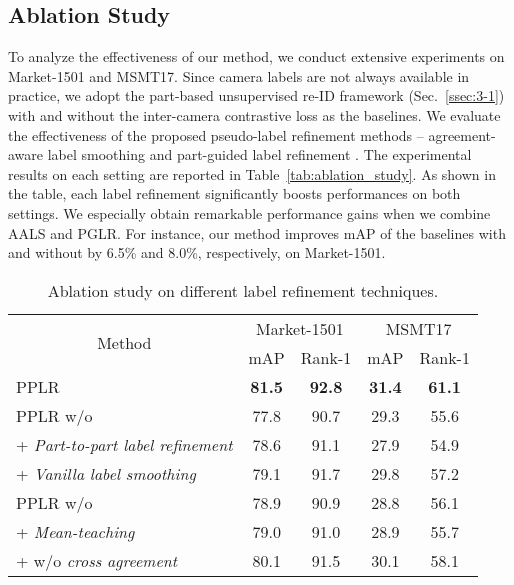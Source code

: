 \documentclass[10pt,twocolumn,letterpaper]{article}
\begin{document}
\subsection{Ablation Study}
    To analyze the effectiveness of our method, we conduct extensive experiments on Market-1501 and MSMT17.
    Since camera labels are not always available in practice, we adopt the part-based unsupervised re-ID framework (Sec.~\ref{ssec:3-1}) with and without the inter-camera contrastive loss  as the baselines.
    We evaluate the effectiveness of the proposed pseudo-label refinement methods -- agreement-aware label smoothing  and part-guided label refinement . 
    The experimental results on each setting are reported in Table~\ref{tab:ablation_study}.
    As shown in the table, each label refinement significantly boosts performances on both settings.
    We especially obtain remarkable performance gains when we combine AALS and PGLR. For instance, our method improves mAP of the baselines with and without  by 6.5\% and 8.0\%, respectively, on Market-1501.
    
    \begin{table}[t]
    	\centering	
    	\begin{adjustbox}{max width=\columnwidth}
    	\footnotesize
        \begin{tabular}{l|cc|cc}
        \hline
        \multicolumn{1}{c|}{\multirow{2}{*}{Method}} & \multicolumn{2}{c|}{Market-1501} & \multicolumn{2}{c}{MSMT17} \\ \cline{2-5} 
         & mAP & Rank-1 & mAP & Rank-1 \\ \hline
        PPLR & \textbf{81.5} & \textbf{92.8} & \textbf{31.4} & \textbf{61.1}\\ \hline
        PPLR w/o  & 77.8 & 90.7 & 29.3 & 55.6 \\
        + \textit{Part-to-part label refinement} & 78.6 & 91.1 & 27.9 & 54.9 \\
        + \textit{Vanilla label smoothing} & 79.1 & 91.7 & 29.8 & 57.2 \\ \hline
        PPLR w/o   & 78.9 & 90.9 & 28.8 & 56.1 \\
        + \textit{Mean-teaching} & 79.0 & 91.0 & 28.9 & 55.7 \\
        +  w/o \textit{cross agreement} & 80.1 & 91.5 & 30.1 & 58.1 \\ \hline
    	\end{tabular}
    	\end{adjustbox}
    	\caption{Ablation study on different label refinement techniques.}
    \label{tab:ablation_study2}
    \vspace{-3.5mm}
    \end{table}
\end{document}
